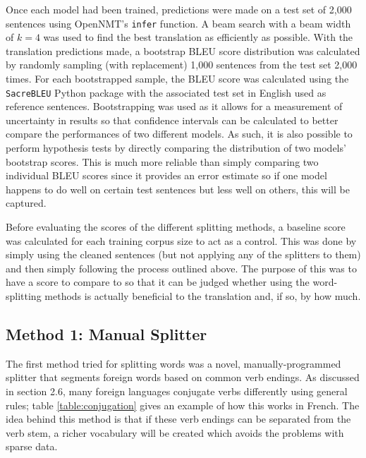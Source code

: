 \documentclass[11pt]{article}
\begin{document}
Once each model had been trained, predictions were made on a test set of 2,000 sentences using OpenNMT’s \texttt{infer} function. A beam search with a beam width of $k = 4$ was used to find the best translation as efficiently as possible. With the translation predictions made, a bootstrap BLEU score distribution was calculated by randomly sampling (with replacement) 1,000 sentences from the test set 2,000 times. For each bootstrapped sample, the BLEU score was calculated using the \texttt{SacreBLEU} Python package \citep{post-2018-call} with the associated test set in English used as reference sentences. Bootstrapping was used as it allows for a measurement of uncertainty in results so that confidence intervals can be calculated to better compare the performances of two different models. As such, it is also possible to perform hypothesis tests by directly comparing the distribution of two models’ bootstrap scores. This is much more reliable than simply comparing two individual BLEU scores since it provides an error estimate so if one model happens to do well on certain test sentences but less well on others, this will be captured.

\bigskip

Before evaluating the scores of the different splitting methods, a baseline score was calculated for each training corpus size to act as a control. This was done by simply using the cleaned sentences (but not applying any of the splitters to them) and then simply following the process outlined above. The purpose of this was to have a score to compare to so that it can be judged whether using the word-splitting methods is actually beneficial to the translation and, if so, by how much.

\subsection{Method 1: Manual Splitter}

The first method tried for splitting words was a novel, manually-programmed splitter that segments foreign words based on common verb endings. As discussed in section 2.6, many foreign languages conjugate verbs differently using general rules; table \ref{table:conjugation} gives an example of how this works in French. The idea behind this method is that if these verb endings can be separated from the verb stem, a richer vocabulary will be created which avoids the problems with sparse data.

\bigskip
\end{document}
